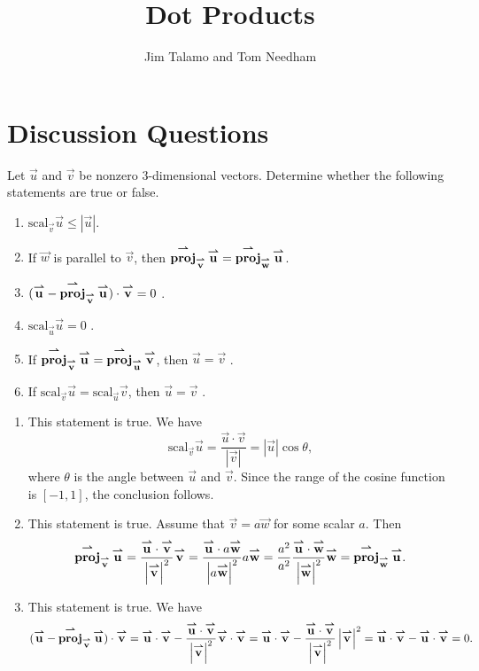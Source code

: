 \documentclass[noauthor, handout]{ximera}
\author{Jim Talamo and Tom Needham}
\title[Collaborate:]{Dot Products}
\begin{document}
\begin{abstract}
\end{abstract}
\maketitle

\section{Discussion Questions}

\begin{problem}
Let $\vec{u}$ and $\vec{v}$ be nonzero $3$-dimensional vectors. Determine whether the following statements are true or false. 

\begin{enumerate}[label=(\alph*)]
\item $\mathrm{scal}_{\vec{v}} \vec{u} \leq \left|\vec{u}\right|$.
\item If $\vec{w}$ is parallel to $\vec{v}$, then $\proj_\vec{v} \vec{u} = \proj_\vec{w} \vec{u}$.
\item $(\vec{u} - \proj_\vec{v} \vec{u}) \cdot \vec{v} = 0$ .
\item $\mathrm{scal}_\vec{u} \vec{u} = 0$ .
\item If $\proj_\vec{v} \vec{u} = \proj_\vec{u} \vec{v}$, then $\vec{u} = \vec{v}$ .
\item If $\mathrm{scal}_\vec{v} \vec{u} = \mathrm{scal}_\vec{u} \vec{v}$, then $\vec{u} = \vec{v}$ .
\end{enumerate}
\begin{freeResponse}
\begin{enumerate}[label=(\alph*)]
\item This statement is true. We have 
$$
\mathrm{scal}_{\vec{v}} \vec{u} = \frac{\vec{u} \cdot \vec{v}}{\left|\vec{v}\right|} = \left|\vec{u}\right| \cos \theta,
$$
where $\theta$ is the angle between $\vec{u}$ and $\vec{v}$. Since the range of the cosine function is $[-1,1]$, the conclusion follows.
\item This statement is true. Assume that $\vec{v} = a \vec{w}$ for some scalar $a$. Then
$$
\proj_\vec{v} \vec{u} = \frac{\vec{u} \cdot \vec{v}}{\left|\vec{v}\right|^2} \vec{v} = \frac{\vec{u} \cdot a \vec{w}}{\left|a \vec{w}\right|^2} a \vec{w} = \frac{a^2}{a^2} \frac{\vec{u} \cdot \vec{w}}{\left|\vec{w}\right|^2} \vec{w} = \proj_\vec{w} \vec{u}.
$$
\item This statement is true. We have
$$
(\vec{u} - \proj_\vec{v} \vec{u}) \cdot \vec{v} = \vec{u} \cdot \vec{v} - \frac{\vec{u} \cdot \vec{v}}{\left|\vec{v}\right|^2} \vec{v} \cdot \vec{v} = \vec{u} \cdot \vec{v} - \frac{\vec{u} \cdot \vec{v}}{\left|\vec{v}\right|^2} \left|\vec{v}\right|^2 = \vec{u} \cdot \vec{v} - \vec{u} \cdot \vec{v} = 0.
$$
\end{enumerate}
\end{freeResponse}
\end{problem}
\end{document}
